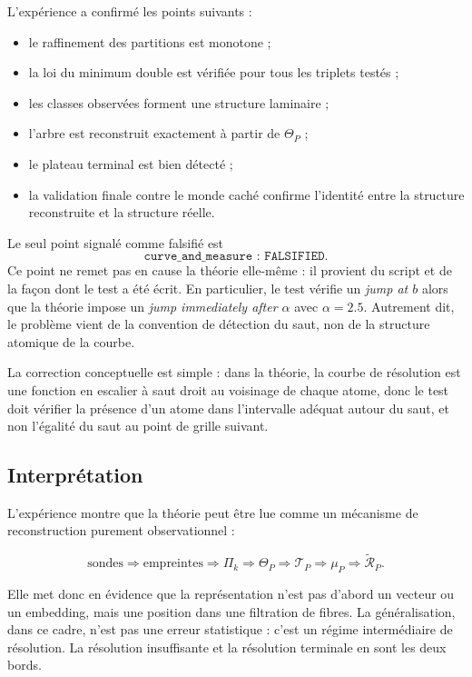 \documentclass[11pt,a4paper]{article}
\begin{document}
\begin{appendices}
L'expérience a confirmé les points suivants :

\begin{itemize}[leftmargin=1.4em]
\item le raffinement des partitions est monotone ;
\item la loi du minimum double est vérifiée pour tous les triplets testés ;
\item les classes observées forment une structure laminaire ;
\item l'arbre est reconstruit exactement à partir de \(\Theta_P\) ;
\item le plateau terminal est bien détecté ;
\item la validation finale contre le monde caché confirme l'identité entre la structure reconstruite et la structure réelle.
\end{itemize}

Le seul point signalé comme falsifié est
\[
\texttt{curve\_and\_measure : FALSIFIED}.
\]
Ce point ne remet pas en cause la théorie elle-même : il provient du script et de la façon dont le test a été écrit. En particulier, le test vérifie un \emph{jump at \(b\)} alors que la théorie impose un \emph{jump immediately after \(\alpha\)} avec \(\alpha=2.5\). Autrement dit, le problème vient de la convention de détection du saut, non de la structure atomique de la courbe.

La correction conceptuelle est simple : dans la théorie, la courbe de résolution est une fonction en escalier à saut droit au voisinage de chaque atome, donc le test doit vérifier la présence d'un atome dans l'intervalle adéquat autour du saut, et non l'égalité du saut au point de grille suivant.

\subsection{Interprétation}

L'expérience montre que la théorie peut être lue comme un mécanisme de reconstruction purement observationnel :

\[
\text{sondes}
\Longrightarrow
\text{empreintes}
\Longrightarrow
\Pi_k
\Longrightarrow
\Theta_P
\Longrightarrow
\mathcal T_P
\Longrightarrow
\mu_P
\Longrightarrow
\widetilde{\mathcal R}_P.
\]

Elle met donc en évidence que la représentation n'est pas d'abord un vecteur ou un embedding, mais une position dans une filtration de fibres. La généralisation, dans ce cadre, n'est pas une erreur statistique : c'est un régime intermédiaire de résolution. La résolution insuffisante et la résolution terminale en sont les deux bords.


\end{appendices}
\end{document}
